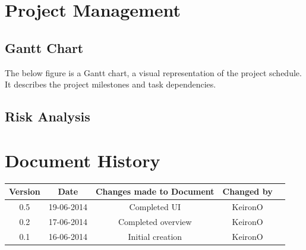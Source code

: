 \documentclass[11pt,a4paper]{article}
\begin{document}
\clearpage
\section{Project Management}

\subsection{Gantt Chart}

The below figure is a Gantt chart, a visual representation of the project schedule. It describes the project milestones and task dependencies.

\subsection{Risk Analysis}

\clearpage

\section*{Document History}

\begin{center}
\begin{tabular}{|c | c | c | c | c |}
\hline
\textbf{Version} \cellcolor{gray!25} & \textbf{Date} \cellcolor{gray!25}& \cellcolor{gray!25}\textbf{Changes made to Document} &\textbf{ Changed by} \cellcolor{gray!25}\\
\hline
0.5 & 19-06-2014 & Completed UI & KeironO \\
\hline
0.2 & 17-06-2014 & Completed overview & KeironO \\
\hline
0.1 & 16-06-2014 & Initial creation & KeironO \\
\hline

\hline
\end{tabular}
\end{center}
\clearpage
\end{document}
